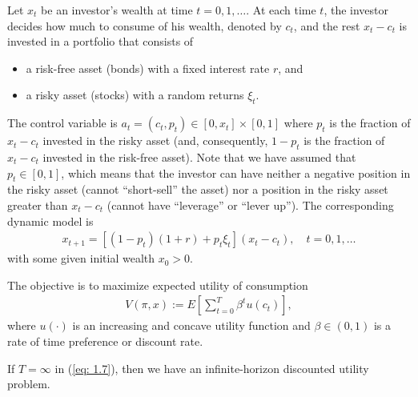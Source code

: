 \documentclass[\topdir/lecture\_notes.tex]{subfiles}
\begin{document}
\begin{example} \label{ex: 1.3} 
Let $x_{t}$ be an investor's wealth at time $t=0,1, \ldots$. At each time $t$, the investor decides how much to consume of his wealth, denoted by $c_{t}$, and the rest $x_{t}-c_{t}$ is invested in a portfolio that consists of
\begin{itemize}
  \item a risk-free asset (bonds) with a fixed interest rate $r$, and
  \item a risky asset (stocks) with a random returns $\xi_{t}$.
\end{itemize}
The control variable is $a_{t}=(c_{t}, p_{t}) \in[0, x_{t}] \times [0,1]$ where $p_{t}$ is the fraction of $x_{t}-c_{t}$ invested in the risky asset (and, consequently, $1-p_{t}$ is the fraction of $x_{t}-c_{t}$ invested in the risk-free asset). Note that we have assumed that $p_t \in [0,1]$, which means that the investor can have neither a negative position in the risky asset (cannot ``short-sell'' the asset) nor a position in the risky asset greater than $x_{t}-c_{t}$ (cannot have ``leverage'' or ``lever up''). The corresponding dynamic model is
\begin{align*}
x_{t+1}=[(1-p_{t})(1+r)+p_{t} \xi_{t}](x_{t}-c_{t}), \quad t=0,1, \ldots
\end{align*}
with some given initial wealth $x_{0} > 0$.

The objective is to maximize expected utility of consumption
\begin{align}
V(\pi, x):=E\left[\sum_{t=0}^{T} \beta^{t} u(c_{t})\right], \label{eq: 1.7}
\end{align}
where $u(\cdot)$ is an increasing and concave utility function and $\beta \in (0,1)$ is a rate of time preference or discount rate.
\end{example} 
If $T=\infty$ in (\ref{eq: 1.7}), then we have an infinite-horizon discounted utility problem. 
\end{document}

